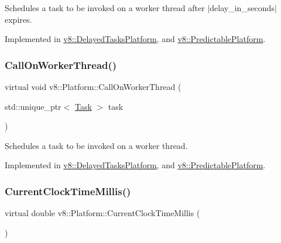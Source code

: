 Schedules a task to be invoked on a worker thread after $\vert$delay\+\_\+in\+\_\+seconds$\vert$ expires. 

Implemented in \mbox{\hyperlink{classv8_1_1DelayedTasksPlatform_aeb214faee105e6335c5a93601cac54c7}{v8\+::\+Delayed\+Tasks\+Platform}}, and \mbox{\hyperlink{classv8_1_1PredictablePlatform_aebe343ebe283f3ffdc905282fbfeb5ad}{v8\+::\+Predictable\+Platform}}.

\mbox{\label{classv8_1_1Platform_a92dc9c2f54c9a0fea87e15df8d58d699}} 
\subsubsection{\texorpdfstring{Call\+On\+Worker\+Thread()}{CallOnWorkerThread()}}
{\footnotesize\ttfamily virtual void v8\+::\+Platform\+::\+Call\+On\+Worker\+Thread (\begin{DoxyParamCaption}\item[{std\+::unique\+\_\+ptr$<$ \mbox{\hyperlink{classv8_1_1Task}{Task}} $>$}]{task }\end{DoxyParamCaption})\hspace{0.3cm}{\ttfamily [pure virtual]}}

Schedules a task to be invoked on a worker thread. 

Implemented in \mbox{\hyperlink{classv8_1_1DelayedTasksPlatform_a9c9cbee600d68caf36aa3c0555ff567f}{v8\+::\+Delayed\+Tasks\+Platform}}, and \mbox{\hyperlink{classv8_1_1PredictablePlatform_a9b41e6b1041c62d9ff5e76a3a7a0aa69}{v8\+::\+Predictable\+Platform}}.

\mbox{\label{classv8_1_1Platform_a8aa46c7f8e492351ebe1bc8168ec9c2f}} 
\subsubsection{\texorpdfstring{Current\+Clock\+Time\+Millis()}{CurrentClockTimeMillis()}}
{\footnotesize\ttfamily virtual double v8\+::\+Platform\+::\+Current\+Clock\+Time\+Millis (\begin{DoxyParamCaption}{ }\end{DoxyParamCaption})\hspace{0.3cm}{\ttfamily [pure virtual]}}

